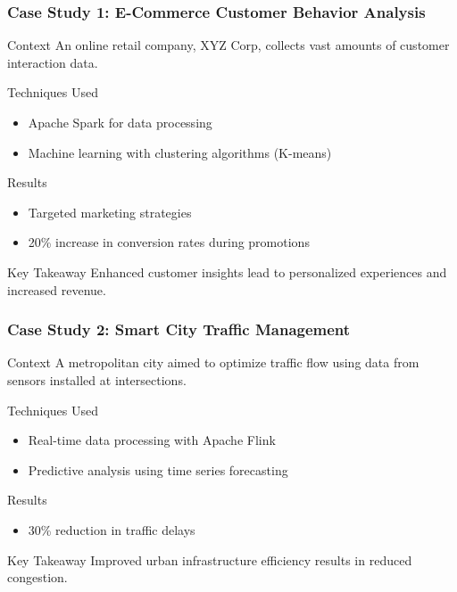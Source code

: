 \documentclass[aspectratio=169]{beamer}
\begin{document}
\begin{frame}[fragile]
    \frametitle{Case Study 1: E-Commerce Customer Behavior Analysis}
    \begin{block}{Context}
        An online retail company, XYZ Corp, collects vast amounts of customer interaction data.
    \end{block}
    \begin{block}{Techniques Used}
        \begin{itemize}
            \item Apache Spark for data processing
            \item Machine learning with clustering algorithms (K-means)
        \end{itemize}
    \end{block}
    \begin{block}{Results}
        \begin{itemize}
            \item Targeted marketing strategies
            \item 20\% increase in conversion rates during promotions
        \end{itemize}
    \end{block}
    \begin{block}{Key Takeaway}
        Enhanced customer insights lead to personalized experiences and increased revenue.
    \end{block}
\end{frame}

\begin{frame}[fragile]
    \frametitle{Case Study 2: Smart City Traffic Management}
    \begin{block}{Context}
        A metropolitan city aimed to optimize traffic flow using data from sensors installed at intersections.
    \end{block}
    \begin{block}{Techniques Used}
        \begin{itemize}
            \item Real-time data processing with Apache Flink
            \item Predictive analysis using time series forecasting
        \end{itemize}
    \end{block}
    \begin{block}{Results}
        \begin{itemize}
            \item 30\% reduction in traffic delays
        \end{itemize}
    \end{block}
    \begin{block}{Key Takeaway}
        Improved urban infrastructure efficiency results in reduced congestion.
    \end{block}
\end{frame}
\end{document}
